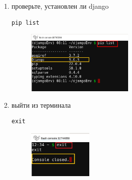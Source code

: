 \documentclass[12pt]{article}
\begin{document}
\begin{enumerate}
    \item проверьте, установлен ли django
			\begin{lstlisting}[caption=\phantom{},style=conlst,label={lst:enter_desktop}]
      pip list
			\end{lstlisting}
	\begin{figure}[H]
		\centering
		\includegraphics[width=0.5\textwidth ,keepaspectratio]{imgs/check_django_installation.png}
		\caption{}
	\end{figure}

    \item выйти из терминала
			\begin{lstlisting}[caption=\phantom{},style=conlst,label={lst:enter_desktop}]
      exit
			\end{lstlisting}
	\begin{figure}[H]
		\centering
		\includegraphics[width=0.3\textwidth ,keepaspectratio]{imgs/exit_terminal.png}
		\caption{}
	\end{figure}
	\end{enumerate}
\end{document}
